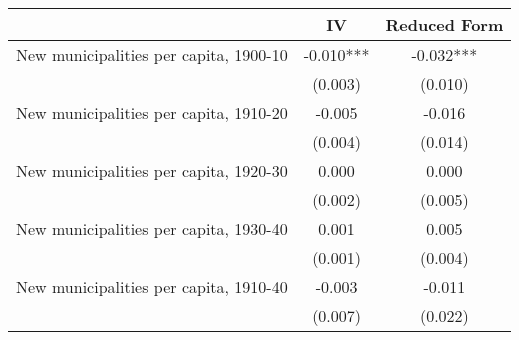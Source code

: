  \begin{tabular}{l*{2}{c}} \toprule
                &\multicolumn{1}{c}{IV}&\multicolumn{1}{c}{Reduced Form}\\
\midrule
New municipalities per capita, 1900-10&   -0.010***&   -0.032***\\
                &  (0.003)   &  (0.010)   \\
\addlinespace
New municipalities per capita, 1910-20&   -0.005   &   -0.016   \\
                &  (0.004)   &  (0.014)   \\
\addlinespace
New municipalities per capita, 1920-30&    0.000   &    0.000   \\
                &  (0.002)   &  (0.005)   \\
\addlinespace
New municipalities per capita, 1930-40&    0.001   &    0.005   \\
                &  (0.001)   &  (0.004)   \\
\addlinespace
New municipalities per capita, 1910-40&   -0.003   &   -0.011   \\
                &  (0.007)   &  (0.022)   \\
 \bottomrule \end{tabular}
